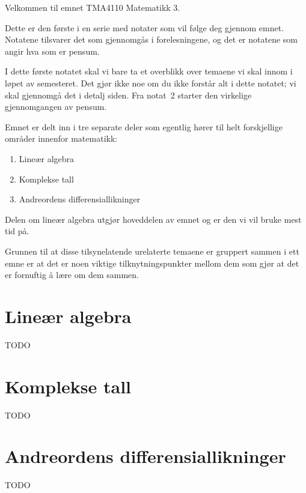 




\noindent%
Velkommen til emnet TMA4110 Matematikk 3.

Dette er den første i en serie med notater som vil følge deg gjennom
emnet.  Notatene tilsvarer det som gjennomgås i forelesningene, og det
er notatene som angir hva som er pensum.

I dette første notatet skal vi bare ta et overblikk over temaene vi
skal innom i løpet av semesteret.  Det gjør ikke noe om du ikke
forstår alt i dette notatet; vi skal gjennomgå det i detalj siden.
Fra notat~2 starter den virkelige gjennomgangen av pensum.

Emnet er delt inn i tre separate deler som egentlig hører til helt
forskjellige områder innenfor matematikk:
\begin{enumerate}
\item Lineær algebra
\item Komplekse tall
\item Andreordens differensiallikninger
\end{enumerate}
Delen om lineær algebra utgjør hoveddelen av emnet og er den vi vil
bruke mest tid på.

Grunnen til at disse tilsynelatende urelaterte temaene er gruppert
sammen i ett emne er at det er noen viktige tilknytningspunkter mellom
dem som gjør at det er fornuftig å lære om dem sammen.


\section*{Lineær algebra}

TODO

\section*{Komplekse tall}

TODO

\section*{Andreordens differensiallikninger}

TODO


